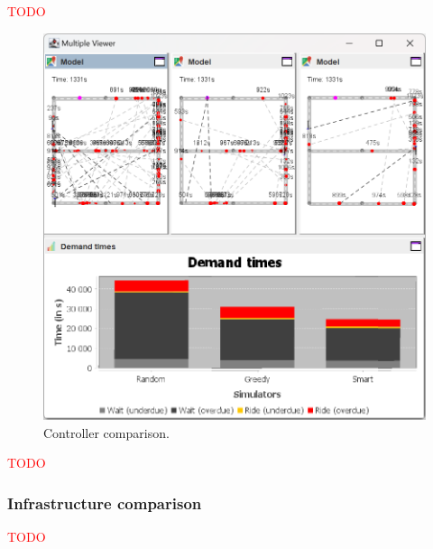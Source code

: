 \documentclass[10pt,twocolumn]{article}
\begin{document}
\textcolor{red}{TODO}

\begin{figure}[!ht]
    \includegraphics[width=\columnwidth]{controller_comparison.png}
    \caption{Controller comparison.}
    \label{fig:controller-comparison}
\end{figure}

\textcolor{red}{TODO}

\subsubsection{Infrastructure comparison}
\label{sec:infrastructure-comparison}

\textcolor{red}{TODO}
\end{document}
